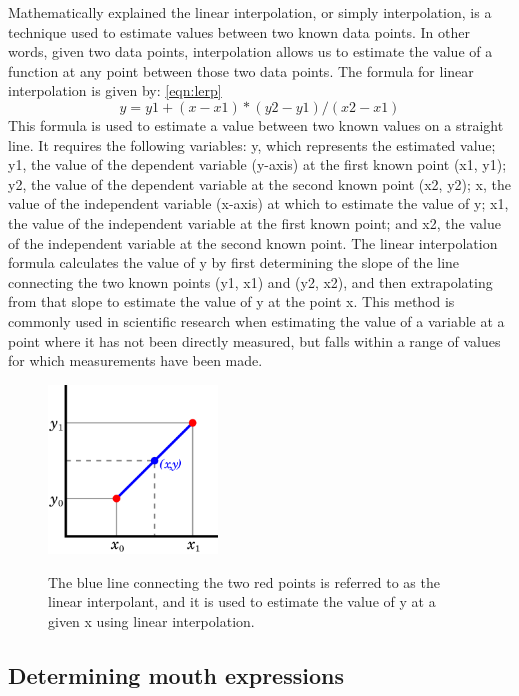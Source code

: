 Mathematically explained the linear interpolation, or simply interpolation, 
is a technique used to estimate values between two known data points. In other words, given two data points, 
interpolation allows us to estimate the value of a function at any point between those two data points.
The formula for linear interpolation is given by: \ref{eqn:lerp}
\begin{equation}
  \label{eqn:lerp}
	y = y1 + (x - x1) * (y2 - y1) / (x2 - x1)
\end{equation}
This formula is used to estimate a value between two known values on a straight line. It requires the following variables: y, 
which represents the estimated value; y1, the value of the dependent variable (y-axis) at the first known point (x1, y1); y2, 
the value of the dependent variable at the second known point (x2, y2); x, the value of the independent variable (x-axis) 
at which to estimate the value of y; x1, the value of the independent variable at the first known point; and x2, the value 
of the independent variable at the second known point.
The linear interpolation formula calculates the value of y by first determining the slope of the line connecting the two 
known points (y1, x1) and (y2, x2), and then extrapolating from that slope to estimate the value of y at the point x. 
This method is commonly used in scientific research when estimating the value of a variable at a point where it has not 
been directly measured, but falls within a range of values for which measurements have been made.

\begin{figure}[htb]
  \centering
  \includegraphics[width=0.4\textwidth]{pics/lerp.png}
  \caption{The blue line connecting the two red points is referred to as the linear interpolant, and it is used to estimate the value of y at a given x using linear interpolation.}
  \cite{angles}
  \label{fig:lerp}
\end{figure}

\subsection{Determining mouth expressions}


